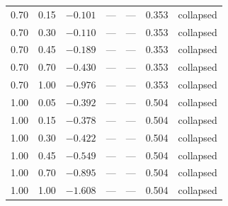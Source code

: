 \begin{tabular}{cc|ccccc}
0.70 & 0.15 & $-0.101$ & --- & --- & 0.353 & collapsed \\
0.70 & 0.30 & $-0.110$ & --- & --- & 0.353 & collapsed \\
0.70 & 0.45 & $-0.189$ & --- & --- & 0.353 & collapsed \\
0.70 & 0.70 & $-0.430$ & --- & --- & 0.353 & collapsed \\
0.70 & 1.00 & $-0.976$ & --- & --- & 0.353 & collapsed \\
1.00 & 0.05 & $-0.392$ & --- & --- & 0.504 & collapsed \\
1.00 & 0.15 & $-0.378$ & --- & --- & 0.504 & collapsed \\
1.00 & 0.30 & $-0.422$ & --- & --- & 0.504 & collapsed \\
1.00 & 0.45 & $-0.549$ & --- & --- & 0.504 & collapsed \\
1.00 & 0.70 & $-0.895$ & --- & --- & 0.504 & collapsed \\
1.00 & 1.00 & $-1.608$ & --- & --- & 0.504 & collapsed \\
\bottomrule
\end{tabular}